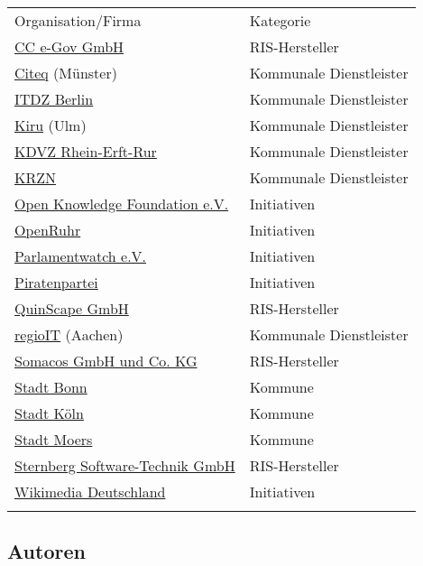 \documentclass[,a4paper]{article}
\begin{document}
\begin{longtable}[c]{@{}ll@{}}
\toprule\addlinespace
Organisation/Firma & Kategorie
\\\addlinespace
\midrule\endhead
\href{http://www.cc-egov.de/}{CC e-Gov GmbH} & RIS-Hersteller
\\\addlinespace
\href{http://www.citeq.de/}{Citeq} (Münster) & Kommunale Dienstleister
\\\addlinespace
\href{http://www.itdz-berlin.de/}{ITDZ Berlin} & Kommunale Dienstleister
\\\addlinespace
\href{http://www.rz-kiru.de/}{Kiru} (Ulm) & Kommunale Dienstleister
\\\addlinespace
\href{http://www.kdvz-frechen.de/}{KDVZ Rhein-Erft-Rur} & Kommunale
Dienstleister
\\\addlinespace
\href{http://www.krzn.de/}{KRZN} & Kommunale Dienstleister
\\\addlinespace
\href{http://okfn.de/}{Open Knowledge Foundation e.V.} & Initiativen
\\\addlinespace
\href{http://openruhr.de/}{OpenRuhr} & Initiativen
\\\addlinespace
\href{http://www.abgeordnetenwatch.de/}{Parlamentwatch e.V.} &
Initiativen
\\\addlinespace
\href{http://www.piratenpartei.de/}{Piratenpartei} & Initiativen
\\\addlinespace
\href{http://www.quinscape.de/}{QuinScape GmbH} & RIS-Hersteller
\\\addlinespace
\href{http://www.regioit-aachen.de/}{regioIT} (Aachen) & Kommunale
Dienstleister
\\\addlinespace
\href{http://www.somacos.de/}{Somacos GmbH und Co. KG} & RIS-Hersteller
\\\addlinespace
\href{http://www.bonn.de/}{Stadt Bonn} & Kommune
\\\addlinespace
\href{http://www.stadt-koeln.de/}{Stadt Köln} & Kommune
\\\addlinespace
\href{http://www.moers.de/}{Stadt Moers} & Kommune
\\\addlinespace
\href{http://www.sitzungsdienst.net/}{Sternberg Software-Technik GmbH} &
RIS-Hersteller
\\\addlinespace
\href{http://www.wikimedia.de/}{Wikimedia Deutschland} & Initiativen
\\\addlinespace
\bottomrule
\end{longtable}

\subsection{Autoren}\label{autoren}
\end{document}
